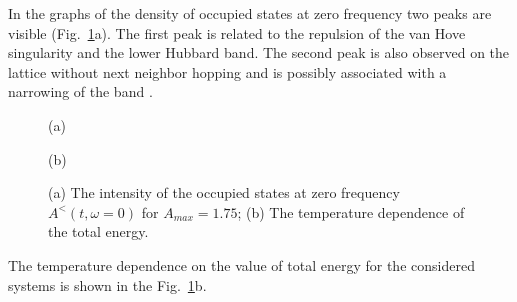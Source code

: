 In the graphs of the density of occupied states at zero frequency two peaks are visible (Fig.~\ref{fig:G_k_les_dep_w0_t_tp_latt}a). The first peak is related to the repulsion of the van Hove singularity and the lower Hubbard band. The second peak is also observed on the lattice without next neighbor hopping and is possibly associated with a narrowing of the band \cite{dasari2019revealing}.
\begin{figure}[h!]
\begin{minipage}[h]{0.5\linewidth}
 (a) \\
\end{minipage}
\hfill
\begin{minipage}[h]{0.5\linewidth}
 (b) \\
\end{minipage}
\caption{(a) The intensity of the occupied states at zero frequency $A^{<}(t,\omega=0)$ for $A_{max}=1.75$; (b) The temperature dependence of the total energy.}
\label{fig:G_k_les_dep_w0_t_tp_latt}
\end{figure}
The temperature dependence on the value of total energy for the considered systems is shown in the Fig.~\ref{fig:G_k_les_dep_w0_t_tp_latt}b.


